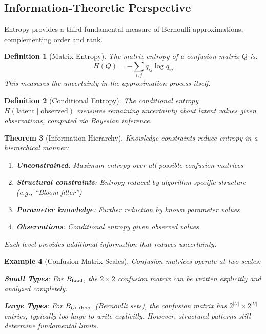 \documentclass[11pt,final,hidelinks]{article}
\newtheorem{theorem}{Theorem}[section]
\newtheorem{definition}[theorem]{Definition}
\newtheorem{example}[theorem]{Example}
\begin{document}
\subsection{Information-Theoretic Perspective}

Entropy provides a third fundamental measure of Bernoulli approximations, complementing order and rank.

\begin{definition}[Matrix Entropy]
The \emph{matrix entropy} of a confusion matrix $Q$ is:
$$H(Q) = -\sum_{i,j} q_{ij} \log q_{ij}$$
This measures the uncertainty in the approximation process itself.
\end{definition}

\begin{definition}[Conditional Entropy]
The \emph{conditional entropy} $H(\text{latent} \mid \text{observed})$ measures remaining uncertainty about latent values given observations, computed via Bayesian inference.
\end{definition}

\begin{theorem}[Information Hierarchy]
Knowledge constraints reduce entropy in a hierarchical manner:
\begin{enumerate}
    \item \textbf{Unconstrained}: Maximum entropy over all possible confusion matrices
    \item \textbf{Structural constraints}: Entropy reduced by algorithm-specific structure (e.g., ``Bloom filter'')  
    \item \textbf{Parameter knowledge}: Further reduction by known parameter values
    \item \textbf{Observations}: Conditional entropy given observed values
\end{enumerate}
Each level provides additional information that reduces uncertainty.
\end{theorem}

\begin{example}[Confusion Matrix Scales]
Confusion matrices operate at two scales:

\textbf{Small Types}: For $B_{\mathrm{bool}}$, the $2 \times 2$ confusion matrix can be written explicitly and analyzed completely.

\textbf{Large Types}: For $B_{U \mapsto \mathrm{bool}}$ (Bernoulli sets), the confusion matrix has $2^{|U|} \times 2^{|U|}$ entries, typically too large to write explicitly. However, \emph{structural patterns} still determine fundamental limits.
\end{example}
\end{document}

